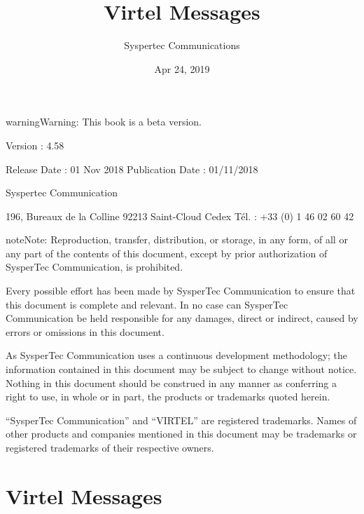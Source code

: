 \documentclass[letterpaper,10pt,english]{sphinxmanual}
\title{Virtel Messages}
\date{Apr 24, 2019}
\author{Syspertec Communications}
\begin{document}
\pagestyle{empty}
\sphinxmaketitle
\pagestyle{plain}
\sphinxtableofcontents
\pagestyle{normal}
\label{\detokenize{messages::doc}}




\begin{sphinxadmonition}{warning}{Warning:}
This book is a beta version.
\end{sphinxadmonition}

Version : 4.58

Release Date : 01 Nov 2018 Publication Date : 01/11/2018

Syspertec Communication

196, Bureaux de la Colline 92213 Saint-Cloud Cedex Tél. : +33 (0) 1 46 02 60 42


\begin{sphinxadmonition}{note}{Note:}
Reproduction, transfer, distribution, or storage, in any form, of all or any part of
the contents of this document, except by prior authorization of SysperTec
Communication, is prohibited.

Every possible effort has been made by SysperTec Communication to ensure that this document
is complete and relevant. In no case can SysperTec Communication be held responsible for
any damages, direct or indirect, caused by errors or omissions in this document.

As SysperTec Communication uses a continuous development methodology; the information
contained in this document may be subject to change without notice. Nothing in this
document should be construed in any manner as conferring a right to use, in whole or in
part, the products or trademarks quoted herein.

“SysperTec Communication” and “VIRTEL” are registered trademarks. Names of other products
and companies mentioned in this document may be trademarks or registered trademarks of
their respective owners.
\end{sphinxadmonition}


\chapter{Virtel Messages}
\label{\detokenize{messages:virtel-messages}}\label{\detokenize{messages:v458mg-introduction}}
\end{document}

